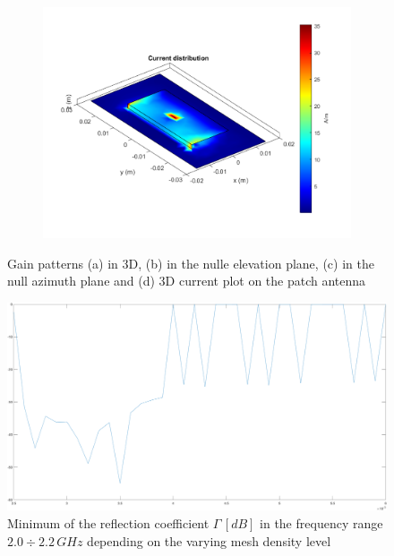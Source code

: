 \documentclass[12pt,a4paper]{article}
\begin{document}
{\begin{figure}[h]
\begin{center}
\begin{subfigure}{0.5\linewidth}
	\includegraphics[scale=0.5]{pifa_currents.pdf}
	\caption{} \end{subfigure}
		\caption{\selectfont
			\color{gray}
		Gain patterns (a) in 3D, (b) in the nulle elevation plane, (c) in the null azimuth plane and (d) 3D current plot on the patch antenna }
	\end{center}  
\end{figure}
\begin{center}
	\begin{figure}[h]
		\includegraphics[scale=0.3]{mesh_levels.png}
		\caption{{Minimum of the reflection coefficient $\Gamma\, [dB]$ in the frequency range $2.0\div 2.2\,GHz$ depending on the varying mesh density level}}
	\end{figure}
\end{center}
}
\end{document}
